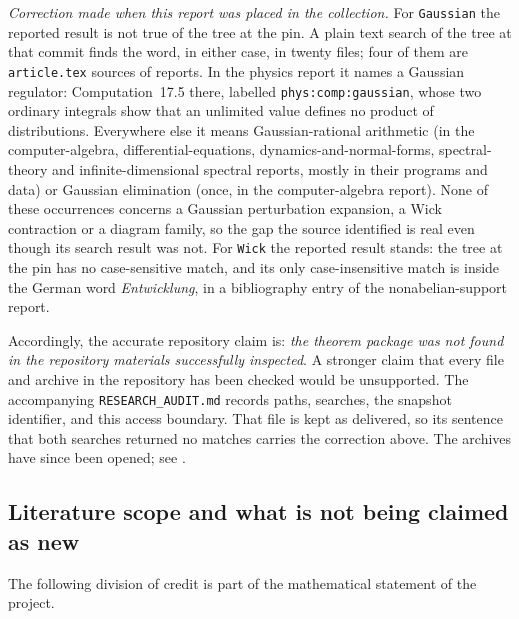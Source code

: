 \documentclass[11pt,letterpaper]{article}
\numberwithin{equation}{section}
\theoremstyle{definition}
\theoremstyle{remark}
\begin{document}
\emph{Correction made when this report was placed in the collection.} For
\texttt{Gaussian} the reported result is not true of the tree at the pin. A
plain text search of the tree at that commit finds the word, in either
case, in twenty files; four of them are \texttt{article.tex} sources of reports. In the physics report it names
a Gaussian regulator: Computation~17.5 there, labelled
\texttt{phys:comp:gaussian}, whose two ordinary integrals show that an
unlimited value defines no product of distributions. Everywhere else it
means Gaussian-rational arithmetic (in the computer-algebra,
differential-equations, dynamics-and-normal-forms, spectral-theory and
infinite-dimensional spectral reports, mostly in their programs and data)
or Gaussian elimination (once, in the computer-algebra report). None of
these occurrences concerns a Gaussian perturbation expansion, a Wick
contraction or a diagram family, so the gap the source identified is real
even though its search result was not. For \texttt{Wick} the reported result
stands: the tree at the pin has no case-sensitive match, and its only
case-insensitive match is inside the German word \emph{Entwicklung}, in a
bibliography entry of the nonabelian-support report.

Accordingly, the accurate repository claim is: \emph{the theorem package was
not found in the repository materials successfully inspected}. A stronger
claim that every file and archive in the repository has been checked would
be unsupported. The accompanying \texttt{RESEARCH\_AUDIT.md} records paths,
searches, the snapshot identifier, and this access boundary. That file is
kept as delivered, so its sentence that both searches returned no matches
carries the correction above. The archives have since been opened; see
.

\subsection{Literature scope and what is not being claimed as new}

The following division of credit is part of the mathematical statement of
the project.
\end{document}

